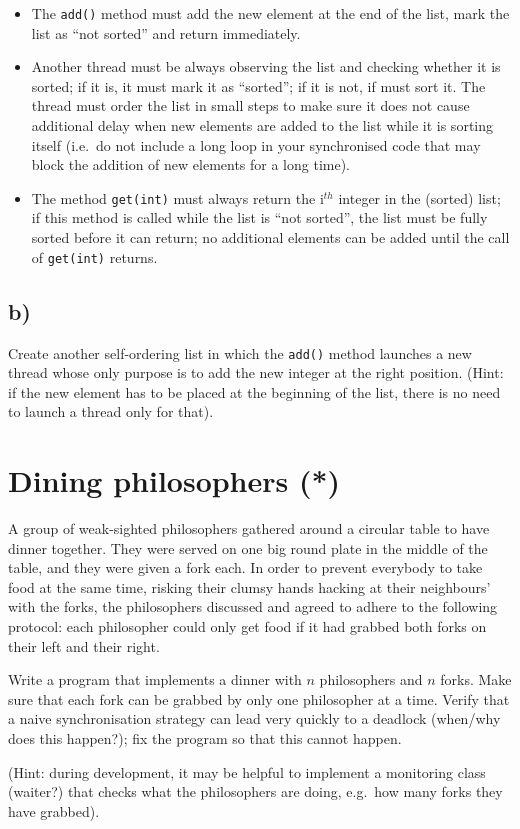 \documentclass{article}
\begin{document}
\begin{itemize}
\item The \verb+add()+ method must add the new element at the end
  of the list, mark the list as ``not sorted'' and return immediately.
\item Another thread must be always observing the list and checking whether
  it is sorted; if it is, it must mark it as ``sorted''; if it is
  not, if must sort it. The thread must order the list in small steps
  to make sure it does not cause additional delay when new elements
  are added to the list while it is sorting itself (i.e.~do not
  include a long loop in your synchronised code that may block the
  addition of new elements for a long time).
\item The method \verb+get(int)+ must always return the i$^{th}$
  integer in the (sorted) list; if this method is called while the
  list is ``not sorted'', the list must be fully sorted before it can
  return; no additional elements can be added until the call of
  \verb+get(int)+ returns.
\end{itemize}

\subsection{b)}
\label{sec:b}

Create another self-ordering list in which the \verb+add()+ method
launches a new thread whose only purpose is to add the new integer at
the right position. (Hint: if the new element has to be placed at the
beginning of the list, there is no need to launch a thread only for
that). 


\section{Dining philosophers (*)}
\label{sec:dining-philosophers}

A group of weak-sighted philosophers gathered around a circular table
to have dinner together. They were served on one big round plate in
the middle of the table, and they were given a fork each. In order to
prevent everybody to take food at the same time, risking their clumsy
hands hacking at their neighbours' with the forks, 
the philosophers discussed and agreed to adhere to the following
protocol: each philosopher could only get food if it had grabbed both
forks on their left and their right. 

Write a program that implements a dinner with $n$ philosophers and $n$
forks. Make sure that each fork can be grabbed by only one philosopher
at a time. Verify that a naive synchronisation strategy can lead very
quickly to a deadlock (when/why does this happen?); 
fix the program so that this cannot happen. 

(Hint: during development, it may be helpful to implement a monitoring
class (waiter?)  that checks what the philosophers are doing, e.g.~how
many forks they have grabbed).
\end{document}
